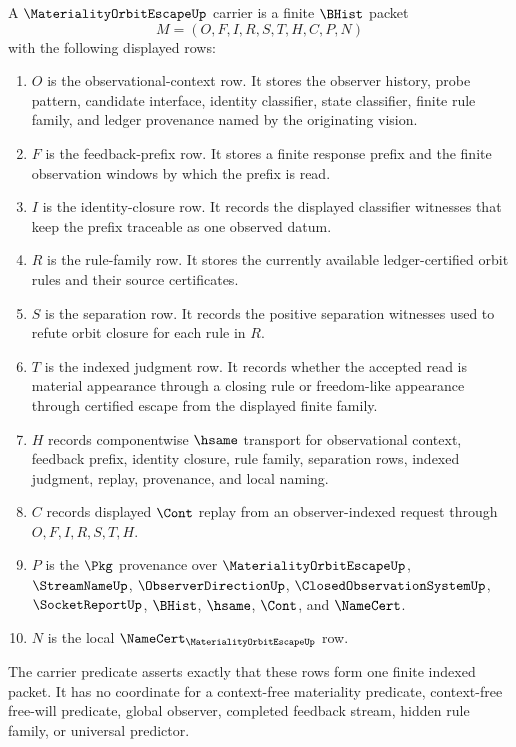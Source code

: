 \begin{definition}\label{def:materiality-orbit-escape-carrier}
A $\MaterialityOrbitEscapeUp$ carrier is a finite $\BHist$ packet
$$
M=(O,F,I,R,S,T,H,C,P,N)
$$
with the following displayed rows:
\begin{enumerate}
\item $O$ is the observational-context row. It stores the observer history, probe pattern, candidate interface, identity classifier, state classifier, finite rule family, and ledger provenance named by the originating vision.
\item $F$ is the feedback-prefix row. It stores a finite response prefix and the finite observation windows by which the prefix is read.
\item $I$ is the identity-closure row. It records the displayed classifier witnesses that keep the prefix traceable as one observed datum.
\item $R$ is the rule-family row. It stores the currently available ledger-certified orbit rules and their source certificates.
\item $S$ is the separation row. It records the positive separation witnesses used to refute orbit closure for each rule in $R$.
\item $T$ is the indexed judgment row. It records whether the accepted read is material appearance through a closing rule or freedom-like appearance through certified escape from the displayed finite family.
\item $H$ records componentwise $\hsame$ transport for observational context, feedback prefix, identity closure, rule family, separation rows, indexed judgment, replay, provenance, and local naming.
\item $C$ records displayed $\Cont$ replay from an observer-indexed request through $O,F,I,R,S,T,H$.
\item $P$ is the $\Pkg$ provenance over $\MaterialityOrbitEscapeUp$, $\StreamNameUp$, $\ObserverDirectionUp$, $\ClosedObservationSystemUp$, $\SocketReportUp$, $\BHist$, $\hsame$, $\Cont$, and $\NameCert$.
\item $N$ is the local $\NameCert_{\MaterialityOrbitEscapeUp}$ row.
\end{enumerate}
The carrier predicate asserts exactly that these rows form one finite indexed packet. It has no coordinate for a context-free materiality predicate, context-free free-will predicate, global observer, completed feedback stream, hidden rule family, or universal predictor.
\end{definition}

